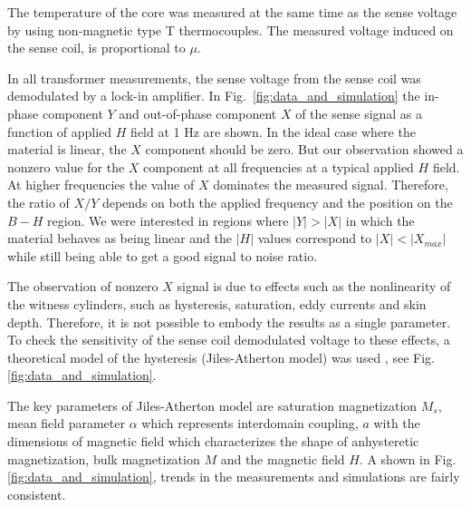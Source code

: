 The temperature of the core was measured at the same time as the sense voltage by using non-magnetic type T thermocouples. The measured voltage induced on the sense coil, is proportional to $\mu$.  

In all transformer measurements, the sense voltage from the sense coil
was demodulated by a lock-in amplifier. In
Fig.~\ref{fig:data_and_simulation} the in-phase component $Y$ and
out-of-phase component $X$ of the sense signal as a function of
applied $H$ field at 1 Hz are shown. In the ideal case where the
material is linear, the $X$ component should be zero. But our observation showed a nonzero value for the $X$ component at all frequencies at a typical applied $H$ field. At higher frequencies the value of $X$ dominates the measured signal.
Therefore, the ratio of $X/Y$ depends on both the applied frequency and the position on the
$B-H$ region. We were interested in regions where $\vert Y \vert >
\vert X \vert $ in which the material behaves as being linear and the
$\vert H \vert $ values correspond to $\vert X \vert < \vert X_{max}
\vert$ while still being able to get a good signal to noise ratio.


The observation of nonzero $X$ signal is due to effects such as the nonlinearity of the witness cylinders, such as hysteresis, saturation, eddy currents and skin depth. Therefore, it is not possible to embody the results as a single parameter.
To check the sensitivity of the sense coil demodulated voltage to
these effects, a theoretical model of the hysteresis (Jiles-Atherton
model) was used \cite{bib:jiles}, see Fig.
\ref{fig:data_and_simulation}.

The key parameters of Jiles-Atherton model are saturation
magnetization $M_s$, mean field parameter $\alpha$ which represents
interdomain coupling, $a$ with the dimensions of magnetic field which
characterizes the shape of anhysteretic magnetization, bulk
magnetization $M$ and the magnetic field $H$. A shown in
Fig. \ref{fig:data_and_simulation}, trends in the measurements and
simulations are fairly consistent.


